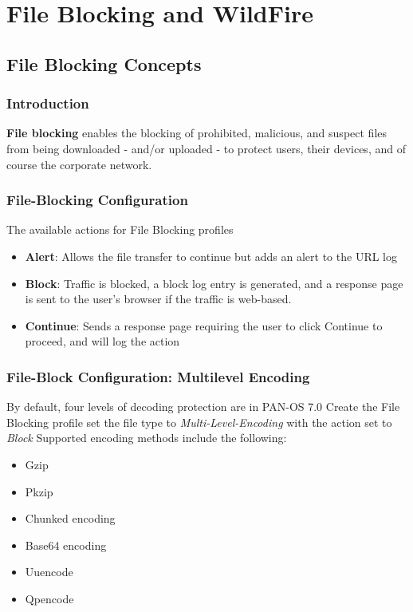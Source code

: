 \section{File Blocking and WildFire}
\subsection{File Blocking Concepts}
\subsubsection{Introduction}
\textbf{File blocking} enables the blocking of prohibited, malicious, and suspect files from being downloaded - and/or uploaded - to protect users, their devices, and of course the corporate network.

\subsubsection{File-Blocking Configuration}
The available actions for File Blocking profiles
    \begin{itemize}
        \item \textbf{Alert}: Allows the file transfer to continue but adds an alert to the URL log
        \item \textbf{Block}: Traffic is blocked, a block log entry is generated, and a response page is sent to the user's browser if the traffic is web-based.
        \item \textbf{Continue}: Sends a response page requiring the user to click Continue to proceed, and will log the action
    \end{itemize}

\subsubsection{File-Block Configuration: Multilevel Encoding}
By default, four levels of decoding protection are in PAN-OS 7.0
Create the File Blocking profile set the file type to \textit{Multi-Level-Encoding} with the action set to \textit{Block}
Supported encoding methods include the following:
    \begin{itemize}
        \item Gzip
        \item Pkzip
        \item Chunked encoding
        \item Base64 encoding
        \item Uuencode
        \item Qpencode
    \end{itemize}
